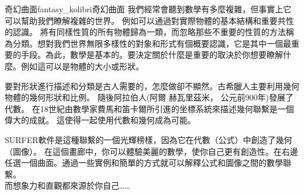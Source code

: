 \begin{surferIntroPage}{奇幻曲面}{fantasy_kolibri}{奇幻曲面}
我們經常會聽到數學有多麼複雜，但事實上它可以幫助我們瞭解複雜的世界。 例如可以通過對實際物體的基本結構和重要共性的認識。 將有同樣性質的所有物體歸為一類，而忽略那些不重要的性質的方法稱為分類。想對我們世界無限多樣性的對象和形式有個概要認識，它是其中一個最重要的手段。為此，數學是基本的。要決定關於什麼是重要的取決於你想要瞭解什麼。例如這可以是物體的大小或形狀。\\

\vspace{0.4cm}


要對形狀進行描述和分類是古人需要的，怎麼做卻不顯然。古希臘人主要利用幾何物體的幾何形狀和比例。 隨後阿拉伯人(阿爾 赫瓦里茲米， 公元前900年)發展了代數。 在18世紀由數學家費馬和笛卡爾所引進的坐標系統來描述幾何聯繫是一個偉大的成就。 這使得一起使用代數和幾何成為可能。\\

\vspace{0.4cm}

SURFER軟件是這種聯繫的一個光輝榜樣，因為它在代數（公式）中創造了幾何（圖像）。
在這個畫廊中，你可以體驗美麗的數學，使你自己更有創造性。在右邊任選一個曲面。通過一些實例和簡單的方式就可以解釋公式和圖像之間的數學聯繫。\\
而想象力和直觀都來源於你自己……
\end{surferIntroPage}
